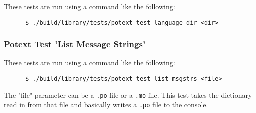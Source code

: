    These tests are run using a command like the following:

   \begin{verbatim}
      $ ./build/library/tests/potext_test language-dir <dir>
   \end{verbatim}

\subsubsection{Potext Test 'List Message Strings'}
\label{subsubsec:potext_test_list_message_strings}

   These tests are run using a command like the following:

   \begin{verbatim}
      $ ./build/library/tests/potext_test list-msgstrs <file>
   \end{verbatim}

   The "file" parameter can be a \texttt{.po} file or a
   \texttt{.mo} file.
   This test takes the dictionary read in from that file and
   basically writes a \texttt{.po} file to the console.

